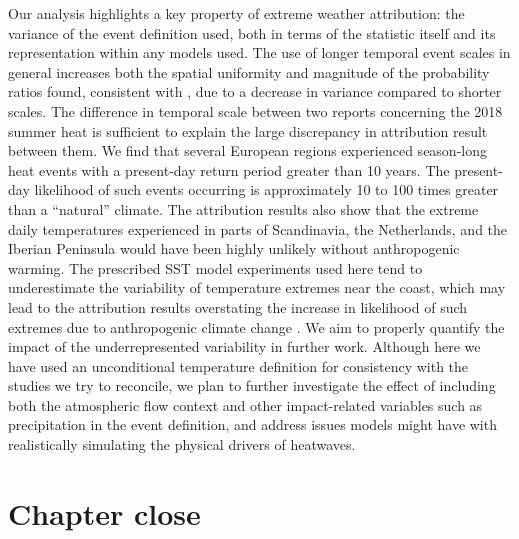   Our analysis highlights a key property of extreme weather attribution: the variance of the event definition used, both in terms of the statistic itself and its representation within any models used. The use of longer temporal event scales in general increases both the spatial uniformity and magnitude of the probability ratios found, consistent with \citet{kirchmeieryoung_importance_2019}, due to a decrease in variance compared to shorter scales. The difference in temporal scale between two reports concerning the 2018 summer heat is sufficient to explain the large discrepancy in attribution result between them. We find that several European regions experienced season-long heat events with a present-day return period greater than 10 years. The present-day likelihood of such events occurring is approximately 10 to 100 times greater than a “natural” climate. The attribution results also show that the extreme daily temperatures experienced in parts of Scandinavia, the Netherlands, and the Iberian Peninsula would have been highly unlikely without anthropogenic warming. The prescribed SST model experiments used here tend to underestimate the variability of temperature extremes near the coast, which may lead to the attribution results overstating the increase in likelihood of such extremes due to anthropogenic climate change \citep{bellprat_towards_2019}. We aim to properly quantify the impact of the underrepresented variability in further work. Although here we have used an unconditional temperature definition for consistency with the studies we try to reconcile, we plan to further investigate the effect of including both the atmospheric flow context and other impact-related variables such as precipitation in the event definition, and address issues models might have with realistically simulating the physical drivers of heatwaves.

\section{Chapter close}
